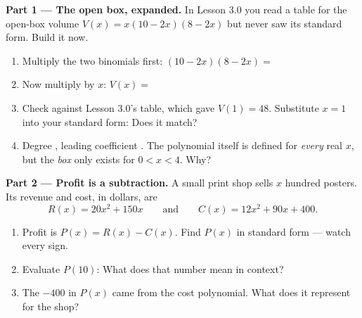 \documentclass[10pt]{article}
\begin{document}
\begin{tcolorbox}[colback=white, colframe=black!40, title=\textbf{Tier E --- Extension},
    fonttitle=\bfseries, arc=1.5mm, left=3mm, right=3mm, top=2mm, bottom=2mm, breakable]
\textbf{Part 1 --- The open box, expanded.} In Lesson 3.0 you read a table for the open-box volume
$V(x) = x(10-2x)(8-2x)$ but never saw its standard form. Build it now.
\begin{enumerate}[label=(\alph*), leftmargin=1.8em, itemsep=6pt]
  \item Multiply the two binomials first: $(10-2x)(8-2x) = $ 
  \item Now multiply by $x$: \; $V(x) = $ 
  \item Check against Lesson 3.0's table, which gave $V(1) = 48$. Substitute $x=1$ into your standard
        form:  \; Does it match? 
  \item Degree , leading coefficient . The polynomial itself is defined for
        \emph{every} real $x$, but the \emph{box} only exists for $0 < x < 4$. Why?
\end{enumerate}

\vspace{5pt}
\textbf{Part 2 --- Profit is a subtraction.} A small print shop sells $x$ hundred posters. Its revenue
and cost, in dollars, are
\[
  R(x) = 20x^2 + 150x \qquad\text{and}\qquad C(x) = 12x^2 + 90x + 400 .
\]
\begin{enumerate}[label=(\alph*), leftmargin=1.8em, itemsep=6pt]
  \item Profit is $P(x) = R(x) - C(x)$. Find $P(x)$ in standard form --- watch every sign.
  \item Evaluate $P(10)$:  \; What does that number mean in context?
  \item The $-400$ in $P(x)$ came from the cost polynomial. What does it represent for the shop?
\end{enumerate}


\end{tcolorbox}
\end{document}
